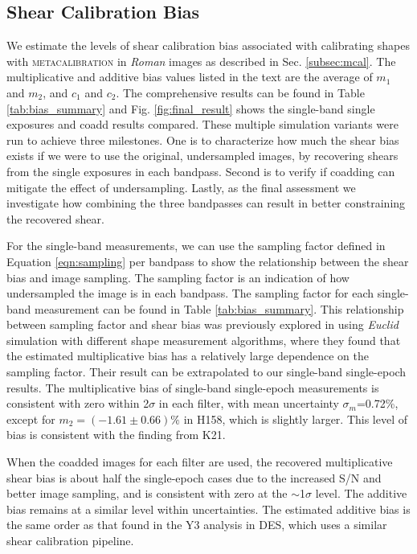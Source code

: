 \documentclass[fleqn,usenatbib]{mnras}
\begin{document}
\subsection{Shear Calibration Bias}
\label{subsec:shapes}
We estimate the levels of shear calibration bias associated with calibrating shapes with \textsc{metacalibration} in \emph{Roman} images as described in Sec. \ref{subsec:mcal}. The multiplicative and additive bias values listed in the text are the average of $m_{1}$ and $m_{2}$, and $c_{1}$ and $c_{2}$. The comprehensive results can be found in Table \ref{tab:bias_summary} and Fig. \ref{fig:final_result} shows the single-band single exposures and coadd results compared. These multiple simulation variants were run to achieve three milestones. One is to characterize how much the shear bias exists if we were to use the original, undersampled images, by recovering shears from the single exposures in each bandpass. Second is to verify if coadding can mitigate the effect of undersampling. Lastly, as the final assessment we investigate how combining the three bandpasses can result in better constraining the recovered shear.


For the single-band measurements, we can use the sampling factor defined in Equation \ref{eqn:sampling} per bandpass to show the relationship between the shear bias and image sampling. The sampling factor is an indication of how undersampled the image is in each bandpass. The sampling factor for each single-band measurement can be found in Table \ref{tab:bias_summary}. This relationship between sampling factor and shear bias was previously explored in \citealt{2021MNRAS.502.4048K} using \emph{Euclid} simulation with different shape measurement algorithms, where they found that the estimated multiplicative bias has a relatively large dependence on the sampling factor. Their result can be extrapolated to our single-band single-epoch results. The multiplicative bias of single-band single-epoch measurements is consistent with zero within 2$\sigma$ in each filter, with mean uncertainty $\sigma_m$=0.72\%, except for $m_{2}=(-1.61\pm0.66)\%$ in H158, which is slightly larger. This level of bias is consistent with the finding from K21. 


When the coadded images for each filter are used, the recovered multiplicative shear bias is about half the single-epoch cases due to the increased S/N and better image sampling, and is consistent with zero at the $\sim$1$\sigma$ level. The additive bias remains at a similar level within uncertainties. The estimated additive bias is the same order as that found in the Y3 analysis in DES, which uses a similar shear calibration pipeline. 
\end{document}
